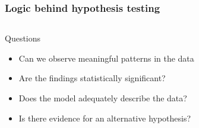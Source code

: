 \documentclass[10pt, compress]{beamer}
\begin{document}
\begin{frame}
    \frametitle{Logic behind hypothesis testing}
    \begin{columns}
        \begin{block}{Questions}
            \begin{itemize}
                \item Can we observe meaningful patterns in the data
                \item Are the findings statistically significant?
                \item Does the model adequately describe the data?
                \item Is there evidence for an alternative hypothesis?
            \end{itemize}
        \end{block}
        \begin{block}{}
            \begin{figure}
                \scalebox{0.7}
                {
                }
            \end{figure}
        \end{block}
    \end{columns}
\end{frame}
\end{document}
